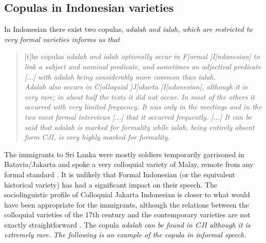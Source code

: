\documentclass[a4paper,12pt]{article}
\begin{document}
\subsection{Copulas in Indonesian varieties}\label{sec:copulaCJI}
In Indonesian there exist two copulas, \em adalah \em and \em ialah\em, which are restricted to very formal varieties
 \citet[98f]{Sneddon2006CJI} informs us that

\begin{quote}
[t]he copulas \em adalah \em and \em ialah \em optionally occur in F[ormal ]I[ndonesian] to link a subject and nominal predicate, and sometimes an adjectival predicate [...] with \em adalah \em being considerably more common than \em ialah.\em\\
\em Adalah \em also occurs in C[olloquial ]J[akarta ]I[ndonesian], although it is very rare; in about half the texts it did not occur. In most of the others it occurred with very limited frequency. It was only in the meetings and in the two most formal interviews [...] that it occurred frequently. [...] It can be said that \em adalah \em is marked for formality while \em ialah, \em being entirely absent form CJI, is very highly marked for formality.
\end{quote}

The immigrants to Sri Lanka were mostly soldiers temporarily garrisoned in Batavia/Jakarta and spoke a very colloquial variety of Malay, remote from any formal standard \citep{Adelaar1991,SmithEtAl2004,Nordhoff2009phd}. It is unlikely that Formal Indonesian (or the equivalent historical variety) has had a significant impact on their speech. The sociolinguistic profile of Colloquial Jakarta Indonesian is closer to what would have been appropriate for the immigrants, although the relations between the colloquial varieties of the 17th century and the contemporary varieties are not exactly straightforward \citep{Grijns1991, AdelaarEtAl1996}. The copula \em adalah \em can be found in CJI although it is extremely rare. The following is an example of the copula in informal speech.

 

\end{document}
